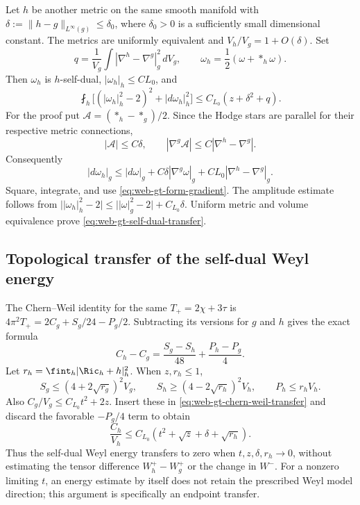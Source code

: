 Let \(h\) be another metric on the same smooth manifold with
\(\delta:=\|h-g\|_{L^\infty(g)}\le\delta_0\), where \(\delta_0>0\)
is a sufficiently small dimensional constant.  The metrics are uniformly
equivalent and \(V_h/V_g=1+O(\delta)\).  Set
\[
 q=\frac1{V_g}\int|\nabla^h-\nabla^g|_g^2\,dV_g,
 \qquad \omega_h=\frac12(\omega+*_h\omega).
\]
Then \(\omega_h\) is \(h\)-self-dual, \(|\omega_h|_h\le CL_0\),
and
\begin{equation}
 \fint_h\bigl[(|\omega_h|_h^2-2)^2+|d\omega_h|_h^2\bigr]
       \le C_{L_0}(z+\delta^2+q).
 \label{eq:web-gt-self-dual-transfer}
\end{equation}
For the proof put \(\mathcal A=(*_h-*_g)/2\).  Since the Hodge stars
are parallel for their respective metric connections,
\[
 |\mathcal A|\le C\delta,\qquad
 |\nabla^g\mathcal A|\le C|\nabla^h-\nabla^g|.
\]
Consequently
\[
 |d\omega_h|_g\le|d\omega|_g+C\delta|\nabla^g\omega|_g
                      +CL_0|\nabla^h-\nabla^g|_g.
\]
Square, integrate, and use \eqref{eq:web-gt-form-gradient}.  The amplitude
estimate follows from
\(\bigl||\omega_h|_h^2-2\bigr|
\le\bigl||\omega|_g^2-2\bigr|+C_{L_0}\delta\).
Uniform metric and volume equivalence prove
\eqref{eq:web-gt-self-dual-transfer}.

\subsection{Topological transfer of the self-dual Weyl energy}

The Chern--Weil identity for the same \(T_+=2\chi+3\tau\) is
\(4\pi^2T_+=2C_g+S_g/24-P_g/2\).  Subtracting its versions for
\(g\) and \(h\) gives the exact formula
\begin{equation}
 C_h-C_g=\frac{S_g-S_h}{48}+\frac{P_h-P_g}{4}.
 \label{eq:web-gt-chern-weil-transfer}
\end{equation}
Let \(r_h=\fint_h|\Ric_h+h|_h^2\).  When \(z,r_h\le1\),
\[
 S_g\le(4+2\sqrt{r_g})^2V_g,\qquad
 S_h\ge(4-2\sqrt{r_h})^2V_h,\qquad P_h\le r_hV_h.
\]
Also \(C_g/V_g\le C_{L_0}t^2+2z\).  Insert these in
\eqref{eq:web-gt-chern-weil-transfer} and discard the favorable
\(-P_g/4\) term to obtain
\begin{equation}
 \frac{C_h}{V_h}\le
       C_{L_0}(t^2+\sqrt z+\delta+\sqrt{r_h}).
 \label{eq:web-gt-weyl-transfer}
\end{equation}
Thus the self-dual Weyl energy transfers to zero when
\(t,z,\delta,r_h\to0\), without estimating the tensor difference
\(W_h^+-W_g^+\) or the change in \(W^-\).  For a nonzero limiting
\(t\), an energy estimate by itself does not retain the prescribed Weyl
model direction; this argument is specifically an endpoint transfer.

